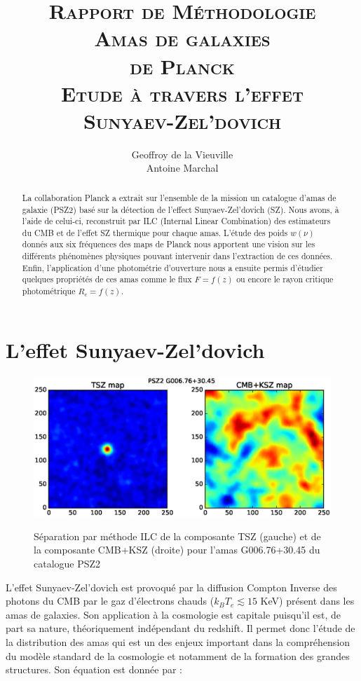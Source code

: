 \documentclass[a4paper,11pt]{article}
\title{{\textsc{\Large{Rapport de Méthodologie}\\ [3cm]
      \textbf{\LARGE{Amas de galaxies \\ de Planck}} \\ [0.6cm] 
Etude à travers l'effet \\ Sunyaev-Zel’dovich}} \\[2cm]}
\author{Geoffroy de la Vieuville \\ Antoine Marchal}
\date{}
\begin{document}
\begin{titlingpage}
\maketitle
\begin{abstract}
  La collaboration Planck a extrait sur l'ensemble de la mission un
  catalogue d'amas de galaxie (PSZ2) basé sur la détection de l'effect
  Sunyaev-Zel’dovich (SZ). Nous avons, à l'aide de celui-ci,
  reconstruit par ILC (Internal Linear Combination) des estimateurs du
  CMB et de l'effet SZ thermique pour chaque amas. 
  L'étude des poids $w(\nu)$ donnés aux six fréquences des 
  maps de Planck nous apportent une vision sur les différents
  phénomènes physiques pouvant intervenir dans l'extraction de ces données. Enfin,
  l'application d'une photométrie d'ouverture nous a ensuite permis 
  d'étudier quelques propriétés de ces amas comme le flux $F=f(z)$ 
  ou encore le rayon critique photométrique $R_{c}=f(z)$.
\end{abstract}
\end{titlingpage}

\newpage

\section{L'effet Sunyaev-Zel’dovich}

\begin{figure}[b!]
  \centering
  \includegraphics[width=4.5in]{sz_effect.eps}
  \label{sz_effect}
  \caption{Séparation par méthode ILC de la composante TSZ (gauche) et de la
    composante CMB+KSZ (droite) pour l'amas G006.76+30.45 du catalogue
  PSZ2}
\end{figure}

L'effet Sunyaev-Zel’dovich \cite{Sunyaev} est provoqué par la diffusion Compton
Inverse des photons du CMB par le gaz d'électrons chauds ($k_B T_e
\lesssim 15$ KeV) présent dans les amas de galaxies. Son application à
la cosmologie est capitale puisqu'il est, de part sa nature, 
théoriquement indépendant du redshift. Il permet donc l'étude de la
distribution des amas qui est un des enjeux important dans la
compréhension du modèle standard de la cosmologie et notamment de la
formation des grandes structures. Son équation est donnée par : 
\end{document}
